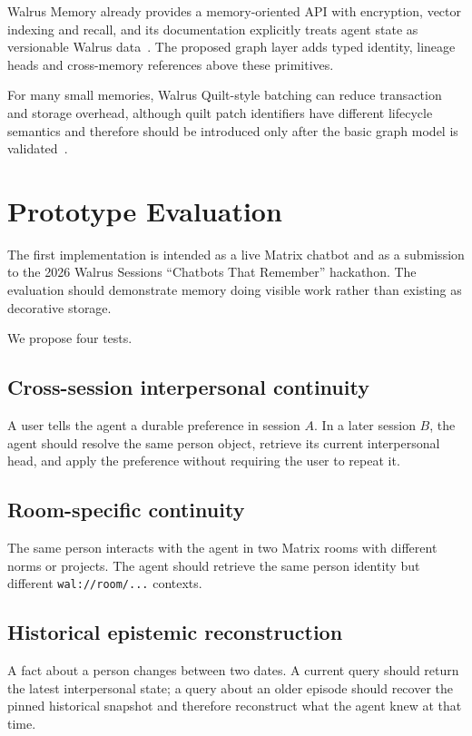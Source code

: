 \documentclass[11pt]{article}
\begin{document}
Walrus Memory already provides a memory-oriented API with encryption, vector indexing and recall, and its documentation explicitly treats agent state as versionable Walrus data~\cite{walrus-lineage,walrus-memory-api}. The proposed graph layer adds typed identity, lineage heads and cross-memory references above these primitives.

For many small memories, Walrus Quilt-style batching can reduce transaction and storage overhead, although quilt patch identifiers have different lifecycle semantics and therefore should be introduced only after the basic graph model is validated~\cite{walrus-agent-loop}.

\section{Prototype Evaluation}

The first implementation is intended as a live Matrix chatbot and as a submission to the 2026 Walrus Sessions ``Chatbots That Remember'' hackathon. The evaluation should demonstrate memory doing visible work rather than existing as decorative storage.

We propose four tests.

\subsection{Cross-session interpersonal continuity}
A user tells the agent a durable preference in session $A$. In a later session $B$, the agent should resolve the same person object, retrieve its current interpersonal head, and apply the preference without requiring the user to repeat it.

\subsection{Room-specific continuity}
The same person interacts with the agent in two Matrix rooms with different norms or projects. The agent should retrieve the same person identity but different \texttt{wal://room/...} contexts.

\subsection{Historical epistemic reconstruction}
A fact about a person changes between two dates. A current query should return the latest interpersonal state; a query about an older episode should recover the pinned historical snapshot and therefore reconstruct what the agent knew at that time.
\end{document}
